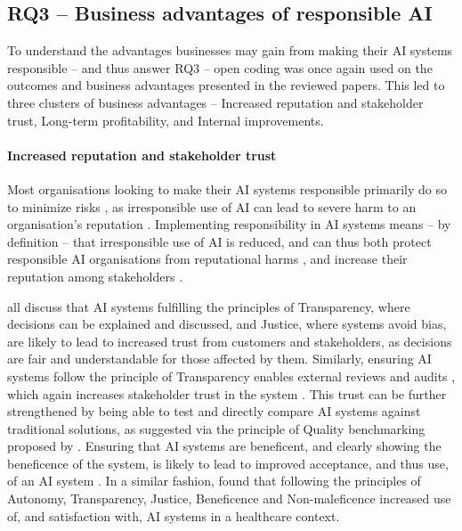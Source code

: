 \subsection{RQ3 -- Business advantages of responsible AI}
\label{sec:results-rq3:advantages}
To understand the advantages businesses may gain from making their AI systems responsible -- and thus answer RQ3 -- open coding was once again used on the outcomes and business advantages presented in the reviewed papers. This led to three clusters of business advantages -- Increased reputation and stakeholder trust, Long-term profitability, and Internal improvements.

\paragraph{Increased reputation and stakeholder trust}
Most organisations looking to make their AI systems responsible primarily do so to minimize risks \parencite{Cheng_2021,Eitel-Porter_2021}, as irresponsible use of AI can lead to severe harm to an organisation's reputation \parencite{Siala_2022,Hagendorff_2020}. Implementing responsibility in AI systems means -- by definition -- that irresponsible use of AI is reduced, and can thus both protect responsible AI organisations from reputational harms \parencite{Buhmann_2021}, and increase their reputation among stakeholders \parencite{Werder_2022}.

\textcite{Anagnostou_2022,Gupta_2021,Merhi_2022} all discuss that AI systems fulfilling the principles of Transparency, where decisions can be explained and discussed, and Justice, where systems avoid bias, are likely to lead to increased trust from customers and stakeholders, as decisions are fair and understandable for those affected by them. Similarly, ensuring AI systems follow the principle of Transparency enables external reviews and audits \parencite{Hacker_2022,Rizinski_2022}, which again increases stakeholder trust in the system \parencite{reinoso_2021_audits}. This trust can be further strengthened by being able to test and directly compare AI systems against traditional solutions, as suggested via the principle of Quality benchmarking proposed by \textcite{Hacker_2022}. Ensuring that AI systems are beneficent, and clearly showing the beneficence of the system, is likely to lead to improved acceptance, and thus use, of an AI system \parencite{Liu_2021,vanBruxvoort_2021}. In a similar fashion, \textcite{WangW_2021} found that following the principles of Autonomy, Transparency, Justice, Beneficence and Non-maleficence increased use of, and satisfaction with, AI systems in a healthcare context.


